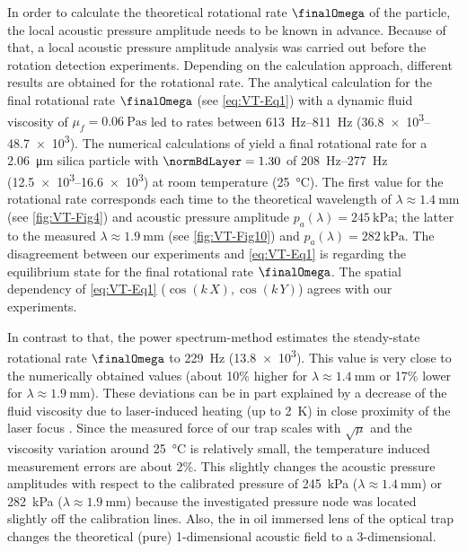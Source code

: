 In order to calculate the theoretical rotational rate $\finalOmega$ of the 
particle, the local acoustic pressure amplitude needs to be known in advance.  
Because of that, a local acoustic pressure amplitude analysis was carried out 
before the rotation detection experiments. Depending on the calculation 
approach, different results are obtained for the rotational rate. The analytical 
calculation for the final rotational rate $\finalOmega$ (see \cref{eq:VT-Eq1}) 
\cite{Lamprecht2015, Busse1981, Rudnick1977, Wang1989} with a dynamic fluid viscosity of 
$\mu_{f} = \SI{0.06}{\pascal\second}$ led to rates between 
\SIrange{613}{811}{\hertz} (\SIrange{36.8e3}{48.7e3}{\rpm}). The numerical 
calculations of \citeauthor{Hahn2016} \cite{Hahn2016} yield a final rotational 
rate for a \SI{2.06}{\micro\meter} silica particle with $\normBdLayer=1.30$ of 
\SIrange{208}{277}{\hertz} (\SIrange{12.5e3}{16.6e3}{\rpm}) at room temperature 
(\SI{25}{\celsius}).  The first value for the rotational rate corresponds each 
time to the theoretical wavelength of $\lambda \approx \SI{1.4}{\mm}$ (see 
\cref{fig:VT-Fig4}) and acoustic pressure amplitude $p_{a}\left(\lambda\right) = 
\SI{245}{\kilo\pascal} $; the latter to the measured $\lambda \approx 
\SI{1.9}{\mm}$ (see \cref{fig:VT-Fig10}) and $p_{a}\left(\lambda\right) = 
\SI{282}{\kilo\pascal} $. The disagreement between our experiments and 
\cref{eq:VT-Eq1} is regarding the equilibrium state for the final rotational rate 
$\finalOmega$. The spatial dependency of \cref{eq:VT-Eq1} ($\cos\left(k\,X\right), 
\cos\left( k\,Y \right)$) agrees with our experiments.

In contrast to that, the power spectrum-method estimates the steady-state 
rotational rate $\finalOmega$ to \SI{229}{\hertz} (\SI{13.8e3}{\rpm}). This 
value is very close to the numerically obtained values (about 10$\%$ higher for 
$\lambda \approx \SI{1.4}{\mm}$ or 17$\%$ lower for $\lambda \approx 
\SI{1.9}{\mm}$).  These deviations can be in part explained by a decrease of 
the fluid viscosity due to laser-induced heating (up to \SI{2}{\kelvin}) in 
close proximity of the laser focus \cite{Peterman2003}. Since the measured force 
of our trap scales with $\sqrt{\mu}$ and the viscosity variation around 
\SI{25}{\celsius} is relatively small, the temperature induced measurement 
errors are about 2\%.  This slightly changes the acoustic pressure amplitudes 
with respect to the calibrated pressure of \SI{245}{\kilo\pascal} ($\lambda 
\approx \SI{1.4}{\mm}$) or \SI{282}{\kilo\pascal} ($\lambda \approx 
\SI{1.9}{\mm}$) because the investigated pressure node was located slightly off 
the calibration lines.  Also, the in oil immersed lens of the optical trap 
changes the theoretical (pure) 1-dimensional acoustic field to a 3-dimensional.

